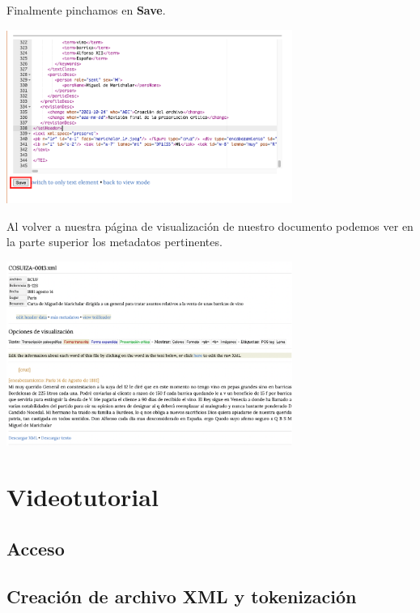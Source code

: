\documentclass[
]{book}
\begin{document}
Finalmente pinchamos en \textbf{Save}.

\includegraphics[width=0.7\textwidth,height=\textheight]{img/editheader4.png}

Al volver a nuestra página de visualización de nuestro documento podemos ver en la parte superior los metadatos pertinentes.

\includegraphics[width=0.7\textwidth,height=\textheight]{img/editheader5.png}

\hypertarget{videotutorial}{%
\section*{Videotutorial}\label{videotutorial}}

\hypertarget{acceso-1}{%
\subsection*{Acceso}\label{acceso-1}}

\hypertarget{creaciuxf3n-de-archivo-xml-y-tokenizaciuxf3n}{%
\subsection*{Creación de archivo XML y tokenización}\label{creaciuxf3n-de-archivo-xml-y-tokenizaciuxf3n}}
\end{document}
